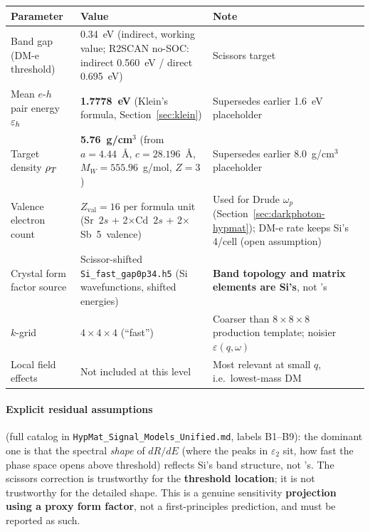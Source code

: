\begin{center}
\begin{tabular}{@{}p{4.3cm}p{4cm}p{5.5cm}@{}}
\toprule
Parameter & Value & Note \\
\midrule
Band gap (DM-e threshold) & 0.34~eV (indirect, working value; R2SCAN no-SOC:
  indirect 0.560~eV / direct 0.695~eV) & Scissors target \\
Mean $e$-$h$ pair energy $\varepsilon_h$ & \textbf{1.7778~eV} (Klein's formula,
  Section~\ref{sec:klein}) & Supersedes earlier 1.6~eV placeholder \\
Target density $\rho_T$ & \textbf{5.76~g/cm$^3$} (from $a=4.44$~\r{A},
  $c=28.196$~\r{A}, $M_W=555.96$~g/mol, $Z=3$) & Supersedes earlier
  8.0~g/cm$^3$ placeholder \\
Valence electron count & $Z_\mathrm{val}=16$ per formula unit
  (Sr~$2s$ + 2$\times$Cd~$2s$ + 2$\times$Sb~5~valence) & Used for Drude
  $\omega_p$ (Section~\ref{sec:darkphoton-hypmat}); DM-e rate keeps Si's
  4/cell (open assumption) \\
Crystal form factor source & Scissor-shifted \texttt{Si\_fast\_gap0p34.h5}
  (Si wavefunctions, shifted energies) & \textbf{Band topology and matrix
  elements are Si's}, not \SrCdSb{}'s \\
$k$-grid & $4\times4\times4$ (``fast'') & Coarser than $8\times8\times8$
  production template; noisier $\varepsilon(q,\omega)$ \\
Local field effects & Not included at this level & Most relevant at small
  $q$, i.e.\ lowest-mass DM \\
\bottomrule
\end{tabular}
\end{center}

\paragraph{Explicit residual assumptions} (full catalog in
\texttt{HypMat\_Signal\_Models\_Unified.md}, labels B1--B9): the dominant
one is that the spectral \emph{shape} of $dR/dE$ (where the peaks in
$\varepsilon_2$ sit, how fast the phase space opens above threshold)
reflects Si's band structure, not \SrCdSb{}'s. The scissors correction is
trustworthy for the \textbf{threshold location}; it is not trustworthy for
the detailed shape. This is a genuine sensitivity \textbf{projection using
a proxy form factor}, not a first-principles prediction, and must be
reported as such.
